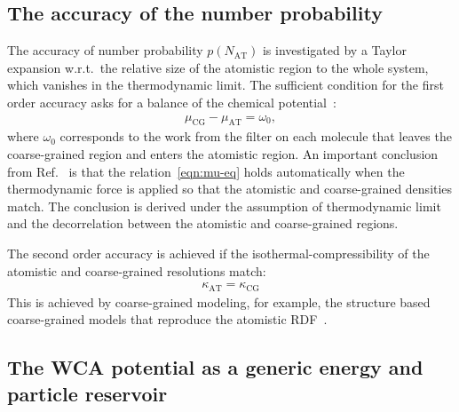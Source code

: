 \documentclass[epjST]{svjour}
\newcommand{\AT}[0]{\textrm{AT}}
\newcommand{\CG}[0]{\textrm{CG}}
\begin{document}
\subsection{The accuracy of the number probability}

The accuracy of number probability $p(N_\AT)$ is investigated by a
Taylor expansion w.r.t.~the relative size of the atomistic region to
the whole system, which vanishes in the thermodynamic limit. The sufficient condition for the first order accuracy
asks for a balance of the chemical potential~\cite{wang2013grand}:
\begin{align}\label{eqn:mu-eq}
  \mu_\CG - \mu_\AT = \omega_0,
\end{align}
where $\omega_0$ corresponds to the work from the filter on each
molecule that leaves the coarse-grained region and  enters the atomistic region. An important conclusion
from Ref.~\cite{wang2013grand} is that the relation~\eqref{eqn:mu-eq}
holds automatically when the thermodynamic force is applied so that the atomistic
and coarse-grained densities match. The conclusion is derived under
the assumption of thermodynamic limit and the decorrelation between the
atomistic and coarse-grained regions.

The second order accuracy is achieved if the isothermal-compressibility of the atomistic and coarse-grained resolutions match:
\begin{align}
  \kappa_\AT = \kappa_\CG
\end{align}
This is achieved by coarse-grained modeling, for example, the
structure based coarse-grained models that reproduce the atomistic
RDF~\cite{wang2009comparative}.

\subsection{The WCA potential as a generic energy and particle reservoir}
\end{document}
